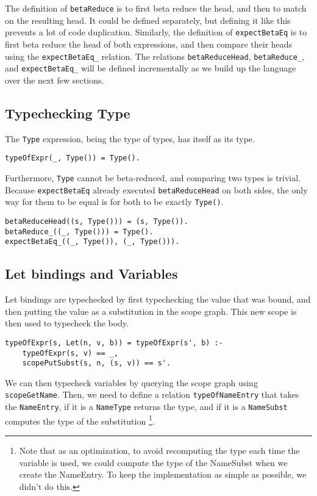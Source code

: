 The definition of \verb|betaReduce| is to first beta reduce the head, and then to match on the resulting head. It could be defined separately, but defining it like this prevents a lot of code duplication. Similarly, the definition of \verb|expectBetaEq| is to first beta reduce the head of both expressions, and then compare their heads using the \verb|expectBetaEq_| relation. The relations \verb|betaReduceHead|,  \verb|betaReduce_|, and \verb|expectBetaEq_|  will be defined incrementally as we build up the language over the next few sections.

\subsection{Typechecking Type}

The \verb|Type| expression, being the type of types, has itself as its type.

\begin{lstlisting}
typeOfExpr(_, Type()) = Type().
\end{lstlisting}

Furthermore, \verb|Type| cannot be beta-reduced, and comparing two types is trivial. Because \verb|expectBetaEq| already executed \verb|betaReduceHead| on both sides, the only way for them to be equal is for both to be exactly \verb|Type()|.

\begin{lstlisting}
betaReduceHead((s, Type())) = (s, Type()).
betaReduce_((_, Type())) = Type().
expectBetaEq_((_, Type()), (_, Type())).
\end{lstlisting}

\subsection{Let bindings and Variables}

Let bindings are typechecked by first typechecking the value that was bound, and then putting the value as a substitution in the scope graph. This new scope is then used to typecheck the body.

\begin{lstlisting}
typeOfExpr(s, Let(n, v, b)) = typeOfExpr(s', b) :-
	typeOfExpr(s, v) == _,
	scopePutSubst(s, n, (s, v)) == s'.
\end{lstlisting}

We can then typecheck variables by querying the scope graph using \verb|scopeGetName|. Then, we need to define a relation \verb|typeOfNameEntry| that takes the \verb|NameEntry|, if it is a \verb|NameType| returns the type, and if it is a \verb|NameSubst| computes the type of the substitution \footnote{Note that as an optimization, to avoid recomputing the type each time the variable is used, we could compute the type of the NameSubst when we create the NameEntry. To keep the implementation as simple as possible, we didn't do this.}. 

